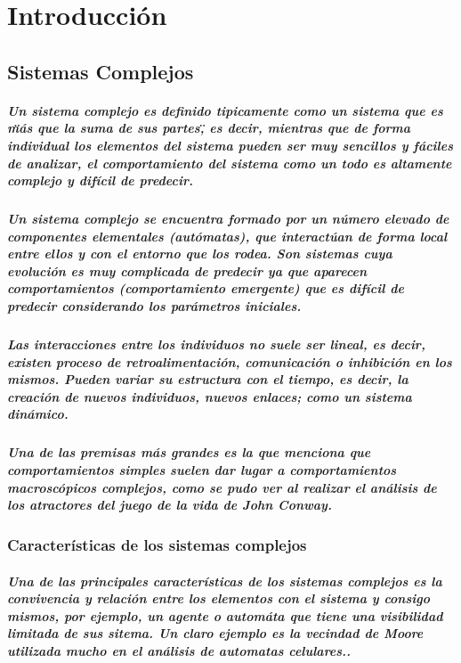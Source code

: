 %
\newpage
\chapter{Introducción}
  \section{Sistemas Complejos}
      \paragraph{Un sistema complejo es definido tipicamente como un sistema que es \"más que la suma de sus partes\", es decir, mientras que de forma individual los elementos del sistema pueden ser muy sencillos y fáciles de analizar, el comportamiento del sistema como un todo es altamente complejo y difícil de predecir.\cite{3}}
      \paragraph{Un sistema complejo se encuentra formado por un número elevado de componentes elementales (autómatas), que interactúan de forma local entre ellos y con el entorno que los rodea. Son sistemas cuya evolución es muy complicada de predecir ya que aparecen comportamientos (comportamiento emergente) que es difícil de predecir considerando los parámetros iniciales.}
      \paragraph{Las interacciones entre los individuos no suele ser lineal, es decir, existen proceso de retroalimentación, comunicación o inhibición en los mismos. Pueden variar su estructura con el tiempo, es decir, la creación de nuevos individuos, nuevos enlaces; como un sistema dinámico. \cite{1}}
      \paragraph{Una de las premisas más grandes es la que menciona que comportamientos simples suelen dar lugar a comportamientos macroscópicos complejos, como se pudo ver al realizar el análisis de los atractores del juego de la vida de John Conway.\cite{2}}
    \subsection{Características de los sistemas complejos}
      \paragraph{Una de las principales características de los sistemas complejos es la convivencia y relación entre los elementos con el sistema y consigo mismos, por ejemplo, un agente o automáta que tiene una visibilidad limitada de sus sitema. Un claro ejemplo es la vecindad de Moore utilizada mucho en el análisis de automatas celulares.\cite{4}.}

